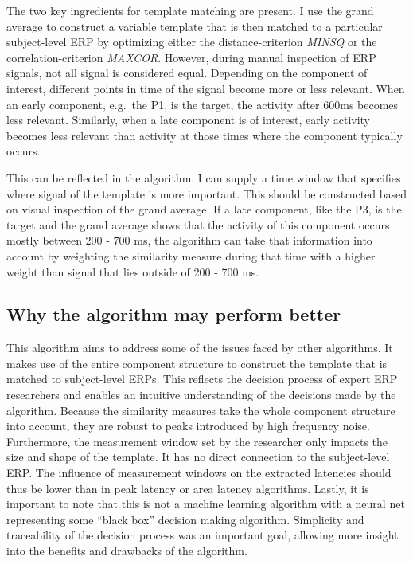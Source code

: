 \documentclass[
  man]{apa7}
\begin{document}
The two key ingredients for template matching are present. I use the grand average to construct a variable template that is then matched to a particular subject-level ERP by optimizing either the distance-criterion \emph{MINSQ} or the correlation-criterion \emph{MAXCOR}. However, during manual inspection of ERP signals, not all signal is considered equal. Depending on the component of interest, different points in time of the signal become more or less relevant. When an early component, e.g.~the P1, is the target, the activity after 600ms becomes less relevant. Similarly, when a late component is of interest, early activity becomes less relevant than activity at those times where the component typically occurs.

This can be reflected in the algorithm. I can supply a time window that specifies where signal of the template is more important. This should be constructed based on visual inspection of the grand average. If a late component, like the P3, is the target and the grand average shows that the activity of this component occurs mostly between 200 - 700 ms, the algorithm can take that information into account by weighting the similarity measure during that time with a higher weight than signal that lies outside of 200 - 700 ms.

\hypertarget{why-the-algorithm-may-perform-better}{%
\subsection{Why the algorithm may perform better}\label{why-the-algorithm-may-perform-better}}

This algorithm aims to address some of the issues faced by other algorithms. It makes use of the entire component structure to construct the template that is matched to subject-level ERPs. This reflects the decision process of expert ERP researchers and enables an intuitive understanding of the decisions made by the algorithm. Because the similarity measures take the whole component structure into account, they are robust to peaks introduced by high frequency noise. Furthermore, the measurement window set by the researcher only impacts the size and shape of the template. It has no direct connection to the subject-level ERP. The influence of measurement windows on the extracted latencies should thus be lower than in peak latency or area latency algorithms. Lastly, it is important to note that this is not a machine learning algorithm with a neural net representing some ``black box'' decision making algorithm. Simplicity and traceability of the decision process was an important goal, allowing more insight into the benefits and drawbacks of the algorithm.
\end{document}
